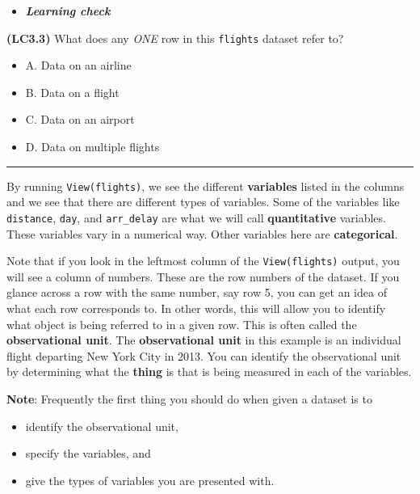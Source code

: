 \documentclass[]{tufte-book}
\let\oldrule=\rule
\renewcommand{\rule}[1]{\oldrule{\linewidth}}
\providecommand{\tightlist}{%
  \setlength{\itemsep}{0pt}\setlength{\parskip}{0pt}}
\newenvironment{rmdblock}[1]
  {\begin{shaded*}
  \begin{itemize}
  \renewcommand{\labelitemi}{
    \raisebox{-.7\height}[0pt][0pt]{
    }
  }
  \item
  }
  {
  \end{itemize}
  \end{shaded*}
  }
\newenvironment{learncheck}
  {\begin{rmdblock}{warning}}
  {\end{rmdblock}}
\begin{document}
\begin{learncheck}
\textbf{\emph{Learning check}}
\end{learncheck}

\textbf{(LC3.3)} What does any \emph{ONE} row in this \texttt{flights}
dataset refer to?

\begin{itemize}
\tightlist
\item
  A. Data on an airline
\item
  B. Data on a flight
\item
  C. Data on an airport
\item
  D. Data on multiple flights
\end{itemize}

\begin{center}\rule{0.5\linewidth}{\linethickness}\end{center}

By running \texttt{View(flights)}, we see the different
\textbf{variables} listed in the columns and we see that there are
different types of variables. Some of the variables like
\texttt{distance}, \texttt{day}, and \texttt{arr\_delay} are what we
will call \textbf{quantitative} variables. These variables vary in a
numerical way. Other variables here are \textbf{categorical}.

Note that if you look in the leftmost column of the
\texttt{View(flights)} output, you will see a column of numbers. These
are the row numbers of the dataset. If you glance across a row with the
same number, say row 5, you can get an idea of what each row corresponds
to. In other words, this will allow you to identify what object is being
referred to in a given row. This is often called the
\textbf{observational unit}. The \textbf{observational unit} in this
example is an individual flight departing New York City in 2013. You can
identify the observational unit by determining what the \textbf{thing}
is that is being measured in each of the variables.

\textbf{Note}: Frequently the first thing you should do when given a
dataset is to

\begin{itemize}
\tightlist
\item
  identify the observational unit,
\item
  specify the variables, and
\item
  give the types of variables you are presented with.
\end{itemize}
\end{document}
